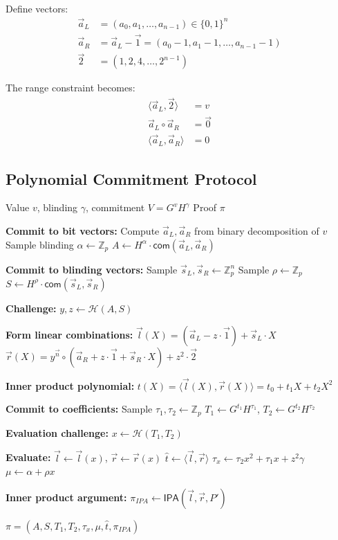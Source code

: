 \documentclass[11pt,a4paper]{article}
\newcommand{\Z}{\mathbb{Z}}
\newcommand{\com}{\mathsf{com}}
\newcommand{\IPA}{\mathsf{IPA}}
\begin{document}
Define vectors:
\begin{align*}
\vec{a}_L &= (a_0, a_1, \ldots, a_{n-1}) \in \{0,1\}^n \\
\vec{a}_R &= \vec{a}_L - \vec{1} = (a_0 - 1, a_1 - 1, \ldots, a_{n-1} - 1) \\
\vec{2} &= (1, 2, 4, \ldots, 2^{n-1})
\end{align*}

The range constraint becomes:
\begin{align}
\langle \vec{a}_L, \vec{2} \rangle &= v \label{eq:value}\\
\vec{a}_L \circ \vec{a}_R &= \vec{0} \label{eq:binary}\\
\langle \vec{a}_L, \vec{a}_R \rangle &= 0 \label{eq:inner}
\end{align}

\subsection{Polynomial Commitment Protocol}

\begin{algorithm}
\caption{Bulletproof Range Proof (Simplified)}
\label{alg:range-proof}
\begin{algorithmic}[1]
\Require Value $v$, blinding $\gamma$, commitment $V = G^v H^\gamma$
\Ensure Proof $\pi$

\State \textbf{Commit to bit vectors:}
\State Compute $\vec{a}_L, \vec{a}_R$ from binary decomposition of $v$
\State Sample blinding $\alpha \gets \Z_p$
\State $A \gets H^\alpha \cdot \com(\vec{a}_L, \vec{a}_R)$

\State \textbf{Commit to blinding vectors:}
\State Sample $\vec{s}_L, \vec{s}_R \gets \Z_p^n$
\State Sample $\rho \gets \Z_p$
\State $S \gets H^\rho \cdot \com(\vec{s}_L, \vec{s}_R)$

\State \textbf{Challenge:}
\State $y, z \gets \mathcal{H}(A, S)$

\State \textbf{Form linear combinations:}
\State $\vec{l}(X) = (\vec{a}_L - z \cdot \vec{1}) + \vec{s}_L \cdot X$
\State $\vec{r}(X) = y^{\vec{n}} \circ (\vec{a}_R + z \cdot \vec{1} + \vec{s}_R \cdot X) + z^2 \cdot \vec{2}$

\State \textbf{Inner product polynomial:}
\State $t(X) = \langle \vec{l}(X), \vec{r}(X) \rangle = t_0 + t_1 X + t_2 X^2$

\State \textbf{Commit to coefficients:}
\State Sample $\tau_1, \tau_2 \gets \Z_p$
\State $T_1 \gets G^{t_1} H^{\tau_1}$, $T_2 \gets G^{t_2} H^{\tau_2}$

\State \textbf{Evaluation challenge:}
\State $x \gets \mathcal{H}(T_1, T_2)$

\State \textbf{Evaluate:}
\State $\vec{l} \gets \vec{l}(x)$, $\vec{r} \gets \vec{r}(x)$
\State $\hat{t} \gets \langle \vec{l}, \vec{r} \rangle$
\State $\tau_x \gets \tau_2 x^2 + \tau_1 x + z^2 \gamma$
\State $\mu \gets \alpha + \rho x$

\State \textbf{Inner product argument:}
\State $\pi_{IPA} \gets \IPA(\vec{l}, \vec{r}, P')$

\State \Return $\pi = (A, S, T_1, T_2, \tau_x, \mu, \hat{t}, \pi_{IPA})$
\end{algorithmic}
\end{algorithm}
\end{document}
